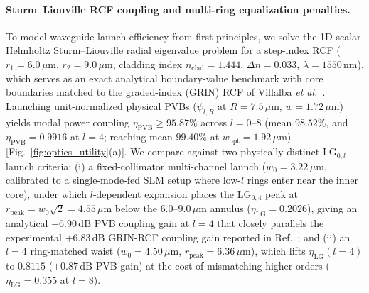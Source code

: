 \documentclass[aps,pra,onecolumn,notitlepage,11pt,tightenlines,amsmath,amssymb,floatfix,longbibliography]{revtex4-2}
\begin{document}
\paragraph*{Sturm--Liouville RCF coupling and multi-ring equalization penalties.}
To model waveguide launch efficiency from first principles, we solve the 1D scalar Helmholtz Sturm--Liouville radial eigenvalue problem for a step-index RCF ($r_1 = 6.0\,\mu\mathrm{m}$, $r_2 = 9.0\,\mu\mathrm{m}$, cladding index $n_{\mathrm{clad}} = 1.444$, $\Delta n = 0.033$, $\lambda = 1550\,\mathrm{nm}$), which serves as an exact analytical boundary-value benchmark with core boundaries matched to the graded-index (GRIN) RCF of Villalba \emph{et al.}~\cite{Villalba2023}. Launching unit-normalized physical PVBs ($\psi_{l,R}$ at $R = 7.5\,\mu\mathrm{m}$, $w = 1.72\,\mu\mathrm{m}$) yields modal power coupling $\eta_{\mathrm{PVB}} \ge 95.87\%$ across $l = 0\text{--}8$ (mean $98.52\%$, and $\eta_{\mathrm{PVB}} = 0.9916$ at $l = 4$; reaching mean $99.40\%$ at $w_{\mathrm{opt}} = 1.92\,\mu\mathrm{m}$) [Fig.~\ref{fig:optics_utility}(a)]. We compare against two physically distinct $\mathrm{LG}_{0,l}$ launch criteria: (i) a fixed-collimator multi-channel launch ($w_0 = 3.22\,\mu\mathrm{m}$, calibrated to a single-mode-fed SLM setup where low-$l$ rings enter near the inner core), under which $l$-dependent expansion places the $\mathrm{LG}_{0,4}$ peak at $r_{\mathrm{peak}} = w_0\sqrt{2} = 4.55\,\mu\mathrm{m}$ below the $6.0\text{--}9.0\,\mu\mathrm{m}$ annulus ($\eta_{\mathrm{LG}} = 0.2026$), giving an analytical $+6.90\,\mathrm{dB}$ PVB coupling gain at $l = 4$ that closely parallels the experimental $+6.83\,\mathrm{dB}$ GRIN-RCF coupling gain reported in Ref.~\cite{Villalba2023}; and (ii) an $l = 4$ ring-matched waist ($w_0 = 4.50\,\mu\mathrm{m}$, $r_{\mathrm{peak}} = 6.36\,\mu\mathrm{m}$), which lifts $\eta_{\mathrm{LG}}(l=4)$ to $0.8115$ ($+0.87\,\mathrm{dB}$ PVB gain) at the cost of mismatching higher orders ($\eta_{\mathrm{LG}} = 0.355$ at $l = 8$).
\end{document}
